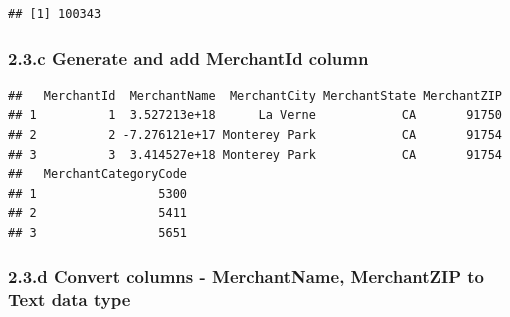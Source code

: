 \documentclass[
]{article}
\newenvironment{Shaded}{\begin{snugshade}}{\end{snugshade}}
\newcommand{\AttributeTok}[1]{\textcolor[rgb]{0.13,0.29,0.53}{#1}}
\newcommand{\DecValTok}[1]{\textcolor[rgb]{0.00,0.00,0.81}{#1}}
\newcommand{\FunctionTok}[1]{\textcolor[rgb]{0.13,0.29,0.53}{\textbf{#1}}}
\newcommand{\NormalTok}[1]{#1}
\newcommand{\OtherTok}[1]{\textcolor[rgb]{0.56,0.35,0.01}{#1}}
\newcommand{\SpecialCharTok}[1]{\textcolor[rgb]{0.81,0.36,0.00}{\textbf{#1}}}
\begin{document}
\begin{verbatim}
## [1] 100343
\end{verbatim}

\subsubsection{2.3.c Generate and add MerchantId
column}\label{c-generate-and-add-merchantid-column}

\begin{Shaded}
\end{Shaded}

\begin{verbatim}
##   MerchantId  MerchantName  MerchantCity MerchantState MerchantZIP
## 1          1  3.527213e+18      La Verne            CA       91750
## 2          2 -7.276121e+17 Monterey Park            CA       91754
## 3          3  3.414527e+18 Monterey Park            CA       91754
##   MerchantCategoryCode
## 1                 5300
## 2                 5411
## 3                 5651
\end{verbatim}

\subsubsection{2.3.d Convert columns - MerchantName, MerchantZIP to Text
data
type}\label{d-convert-columns---merchantname-merchantzip-to-text-data-type}
\end{document}
